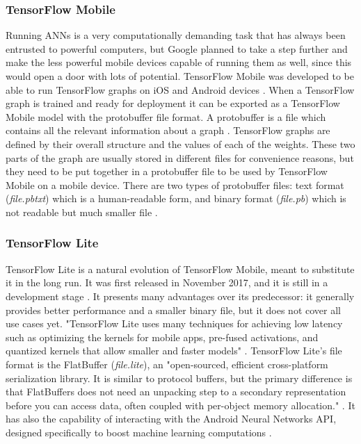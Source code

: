 \subsubsection{TensorFlow Mobile}
Running ANNs is a very computationally demanding task that has always been entrusted to powerful computers, but Google planned to take a step further and make the less powerful mobile devices capable of running them as well, since this would open a door with lots of potential. TensorFlow Mobile was developed to be able to run TensorFlow graphs on iOS and Android devices \cite{tfmobile}. When a TensorFlow graph is trained and ready for deployment it can be exported as a TensorFlow Mobile model with the protobuffer file format. A protobuffer is a file which contains all the relevant information about a graph \cite{varda2008protocol}. TensorFlow graphs are defined by their overall structure and the values of each of the weights. These two parts of the graph are usually stored in different files for convenience reasons, but they need to be put together in a protobuffer file to be used by TensorFlow Mobile on a mobile device. There are two types of protobuffer files: text format (\textit{file.pbtxt}) which is a human-readable form, and binary format (\textit{file.pb}) which is not readable but much smaller file \cite{tfmobile}. 

\subsubsection{TensorFlow Lite}
TensorFlow Lite is a natural evolution of TensorFlow Mobile, meant to substitute it in the long run. It was first released in November 2017, and it is still in a development stage \cite{tflite}. It presents many advantages over its predecessor: it generally provides better performance and a smaller binary file, but it does not cover all use cases yet. "TensorFlow Lite uses many techniques for achieving low latency such as optimizing the kernels for mobile apps, pre-fused activations, and quantized kernels that allow smaller and faster models" \cite{tflite}.
TensorFlow Lite's file format is the FlatBuffer (\textit{file.lite}), an "open-sourced, efficient cross-platform serialization library. It is similar to protocol buffers, but the primary difference is that FlatBuffers does not need an unpacking step to a secondary representation before you can access data, often coupled with per-object memory allocation." \cite{tflite}. It has also the capability of interacting with the Android Neural Networks API, designed specifically to boost machine learning computations \cite{zhang2018pcamp}. 

